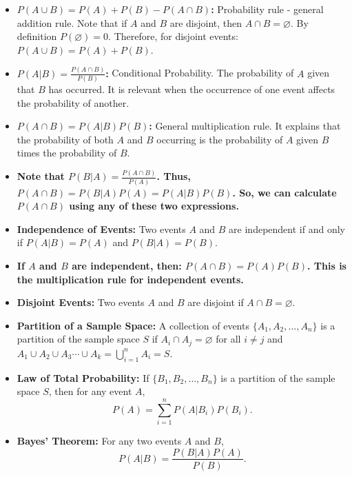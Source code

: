 \documentclass{article}
\let\emptyset\varnothing
\begin{document}
\begin{itemize}
    \item \textbf{\( P(A \cup B) = P(A) + P(B) - P(A \cap B) \):} Probability rule - general addition rule. Note that if \( A \) and \( B \) are disjoint, then \( A \cap B = \emptyset \). By definition \( P(\emptyset) = 0 \). Therefore, for disjoint events: \( P(A \cup B) = P(A) + P(B) \).
    
    \item \textbf{\( P(A|B) = \frac{P(A \cap B)}{P(B)} \):} Conditional Probability. The probability of \( A \) given that \( B \) has occurred. It is relevant when the occurrence of one event affects the probability of another.
    
    \item \textbf{\( P(A \cap B) = P(A|B) P(B) \):} General multiplication rule. It explains that the probability of both \( A \) and \( B \) occurring is the probability of \( A \) given \( B \) times the probability of \( B \).
    
    \item \textbf{Note that \( P(B|A) = \frac{P(A \cap B)}{P(A)} \). Thus, \( P(A \cap B) = P(B|A) P(A) = P(A|B) P(B) \). So, we can calculate \( P(A \cap B) \) using any of these two expressions.}
    
    \item \textbf{Independence of Events:} Two events \( A \) and \( B \) are independent if and only if \( P(A|B) = P(A) \) and \( P(B|A) = P(B) \).
    
    \item \textbf{If \( A \) and \( B \) are independent, then: \( P(A \cap B) = P(A) P(B) \). This is the multiplication rule for independent events.}

    \item \textbf{Disjoint Events:} Two events \( A \) and \( B \) are disjoint if \( A \cap B = \emptyset \).
    
    \item \textbf{Partition of a Sample Space:} A collection of events \( \{A_1, A_2, \ldots, A_n\} \) is a partition of the sample space \( S \) if \( A_i \cap A_j = \emptyset \) for all \( i \neq j \) and \( A_1 \cup A_2 \cup A_3 \cdots \cup A_k = \bigcup_{i=1}^n A_i = S \).
    
    \item \textbf{Law of Total Probability:} If \( \{B_1, B_2, \ldots, B_n\} \) is a partition of the sample space \( S \), then for any event \( A \),
    \[
    P(A) = \sum_{i=1}^n P(A|B_i) P(B_i).
    \]
    
    \item \textbf{Bayes' Theorem:} For any two events \( A \) and \( B \),
    \[
    P(A|B) = \frac{P(B|A)P(A)}{P(B)}.
    \]

\end{itemize}
\end{document}
